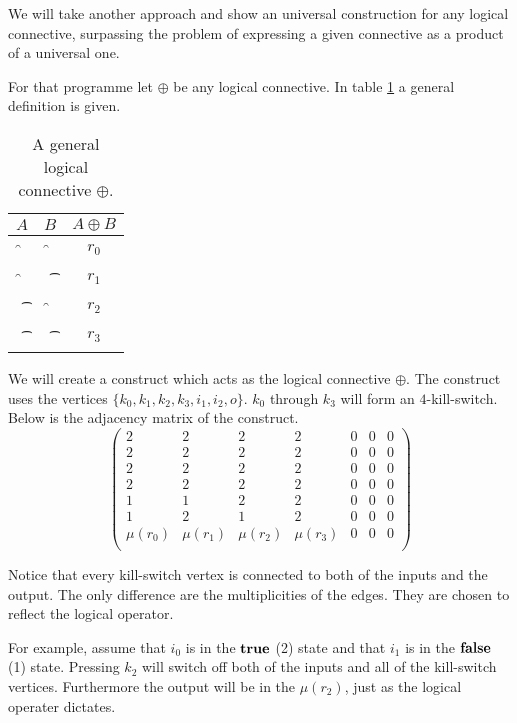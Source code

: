 We will take another approach and show an universal construction for any
logical connective, surpassing the problem of expressing a given
connective as a product of a universal one.

For that programme let $\oplus$ be any logical connective. In table
\ref{table:oplus} a general definition is given.
\begin{table}
	\begin{center}
		\begin{tabular}{c|c|c}
			$A$ & $B$ & $A \oplus B$ \\
			\hline
			\f & \f & $r_{0}$ \\
			\f & \t & $r_{1}$ \\
			\t & \f & $r_{2}$ \\
			\t & \t & $r_{3}$ \\
		\end{tabular}
	\end{center}
	\caption{A general logical connective $\oplus$.}\label{table:oplus} 
\end{table}

We will create a construct which acts as the logical connective
$\oplus$. The construct uses the vertices 
$\{k_{0}, k_{1}, k_{2}, k_{3}, i_{1}, i_{2}, o \}$. $k_{0}$ through $k_{3}$ will
form an $4$-kill-switch. Below is the adjacency matrix of the construct. 
\[
	\left(
	\begin{array}{ccccccc}
		2 & 2 & 2 & 2 & 0 & 0 & 0 \\
		2 & 2 & 2 & 2 & 0 & 0 & 0 \\
		2 & 2 & 2 & 2 & 0 & 0 & 0 \\
		2 & 2 & 2 & 2 & 0 & 0 & 0 \\
		1 & 1 & 2 & 2 & 0 & 0 & 0 \\
		1 & 2 & 1 & 2 & 0 & 0 & 0 \\
		\mu(r_{0}) & \mu(r_{1}) & \mu(r_{2}) & \mu(r_{3}) & 0 & 0 & 0 \\
	\end{array}
	\right)
\]

Notice that every kill-switch vertex is connected to both of the inputs and the
output. The only difference are the multiplicities of the edges. They are chosen
to reflect the logical operator.

For example, assume that $i_{0}$ is in the $\text{\bf true}$ (2) state and that $i_{1}$ is in
the ${\text{\bf false}}$ (1) state. Pressing $k_{2}$ will switch off both of the inputs and all 
of the kill-switch vertices. Furthermore the output will be in the $\mu(r_{2})$,
just as the logical operater dictates. 

